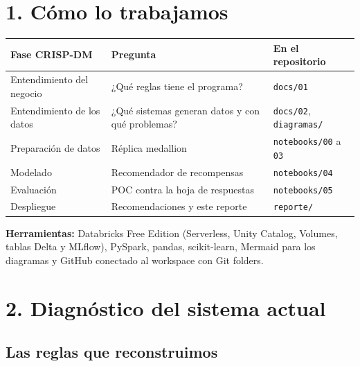\documentclass[12pt,a4paper]{article}
\begin{document}
\section{1. Cómo lo trabajamos}

\begin{center}
\renewcommand{\arraystretch}{1.4}
\begin{tabular}{|>{\raggedright\arraybackslash}p{3.8cm}|>{\raggedright\arraybackslash}p{4.6cm}|>{\raggedright\arraybackslash}p{5.2cm}|}
\hline
\textbf{Fase CRISP-DM} & \textbf{Pregunta} & \textbf{En el repositorio} \\
\hline
Entendimiento del negocio & ¿Qué reglas tiene el programa? & \texttt{docs/01} \\
\hline
Entendimiento de los datos & ¿Qué sistemas generan datos y con qué problemas? & \texttt{docs/02},
\texttt{diagramas/} \\
\hline
Preparación de datos & Réplica medallion & \texttt{notebooks/00} a \texttt{03} \\
\hline
Modelado & Recomendador de recompensas & \texttt{notebooks/04} \\
\hline
Evaluación & POC contra la hoja de respuestas & \texttt{notebooks/05} \\
\hline
Despliegue & Recomendaciones y este reporte & \texttt{reporte/} \\
\hline
\end{tabular}
\end{center}

\textbf{Herramientas:} Databricks Free Edition (Serverless, Unity Catalog, Volumes, tablas Delta y
MLflow), PySpark, pandas, scikit-learn, Mermaid para los diagramas y GitHub conectado al workspace
con Git folders.

\section{2. Diagnóstico del sistema actual}

\subsection{Las reglas que reconstruimos}
\end{document}
